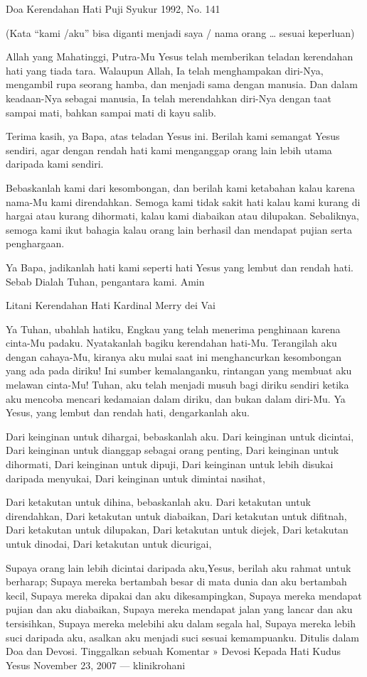 \documentclass[a5paper,headsepline,titlepage,11pt,nnormalheadings,DIVcalc]{scrbook}
\begin{document}
Doa Kerendahan Hati
Puji Syukur 1992, No. 141

(Kata “kami /aku” bisa diganti menjadi saya / nama orang … sesuai keperluan)

Allah yang Mahatinggi, Putra-Mu Yesus telah memberikan teladan kerendahan hati yang tiada tara. Walaupun Allah, Ia telah menghampakan diri-Nya, mengambil rupa seorang hamba, dan menjadi sama dengan manusia. Dan dalam keadaan-Nya sebagai manusia, Ia telah merendahkan diri-Nya dengan taat sampai mati, bahkan sampai mati di kayu salib.

Terima kasih, ya Bapa, atas teladan Yesus ini. Berilah kami semangat Yesus sendiri, agar dengan rendah hati kami menganggap orang lain lebih utama daripada kami sendiri.

Bebaskanlah kami dari kesombongan, dan berilah kami ketabahan kalau karena nama-Mu kami direndahkan. Semoga kami tidak sakit hati kalau kami kurang di hargai atau kurang dihormati, kalau kami diabaikan atau dilupakan. Sebaliknya, semoga kami ikut bahagia kalau orang lain berhasil dan mendapat pujian serta penghargaan.

Ya Bapa, jadikanlah hati kami seperti hati Yesus yang lembut dan rendah hati. Sebab Dialah Tuhan, pengantara kami. Amin

Litani Kerendahan Hati
Kardinal Merry dei Vai

Ya Tuhan, ubahlah hatiku, Engkau yang telah menerima penghinaan karena cinta-Mu padaku. Nyatakanlah bagiku kerendahan hati-Mu. Terangilah aku dengan cahaya-Mu, kiranya aku mulai saat ini menghancurkan kesombongan yang ada pada diriku! Ini sumber kemalanganku, rintangan yang membuat aku melawan cinta-Mu! Tuhan, aku telah menjadi musuh bagi diriku sendiri ketika aku mencoba mencari kedamaian dalam diriku, dan bukan dalam diri-Mu. Ya Yesus, yang lembut dan rendah hati, dengarkanlah aku.

Dari keinginan untuk dihargai, bebaskanlah aku.
Dari keinginan untuk dicintai,
Dari keinginan untuk dianggap sebagai orang penting,
Dari keinginan untuk dihormati,
Dari keinginan untuk dipuji,
Dari keinginan untuk lebih disukai daripada menyukai,
Dari keinginan untuk dimintai nasihat,

Dari ketakutan untuk dihina, bebaskanlah aku.
Dari ketakutan untuk direndahkan,
Dari ketakutan untuk diabaikan,
Dari ketakutan untuk difitnah,
Dari ketakutan untuk dilupakan,
Dari ketakutan untuk diejek,
Dari ketakutan untuk dinodai,
Dari ketakutan untuk dicurigai,

Supaya orang lain lebih dicintai daripada aku,Yesus, berilah aku rahmat untuk berharap;
Supaya mereka bertambah besar di mata dunia dan aku bertambah kecil,
Supaya mereka dipakai dan aku dikesampingkan,
Supaya mereka mendapat pujian dan aku diabaikan,
Supaya mereka mendapat jalan yang lancar dan aku tersisihkan,
Supaya mereka melebihi aku dalam segala hal,
Supaya mereka lebih suci daripada aku, asalkan aku menjadi suci sesuai kemampuanku.
Ditulis dalam Doa dan Devosi. Tinggalkan sebuah Komentar »
Devosi Kepada Hati Kudus Yesus
November 23, 2007 — klinikrohani
\end{document}
